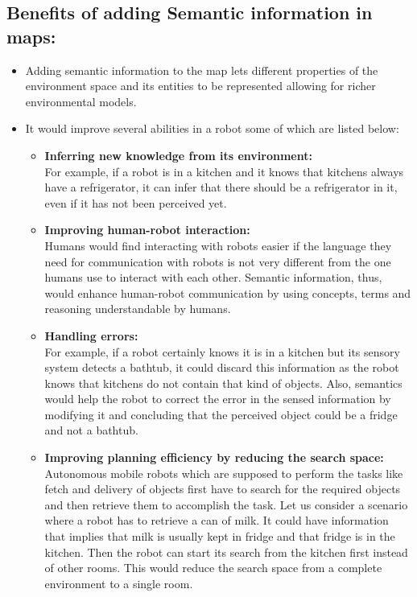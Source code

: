 \subsection{Benefits of adding Semantic information in maps:}
\begin{itemize}[noitemsep,nolistsep]
 \item Adding semantic information to the map lets different properties of the environment space and its entities to be represented allowing for richer environmental models.
 \item It would improve several abilities in a robot \cite{3,5,10} some of which are listed below:
 \begin{itemize}[noitemsep,nolistsep]
  \item \textbf{Inferring new knowledge from its environment:}\\
  For example, if a robot is in a kitchen and it knows that kitchens always have a refrigerator, it can infer that there should be a refrigerator in it, even if it has not been perceived yet. 
  \item \textbf{Improving human-robot interaction:}\\
  Humans would find interacting with robots easier if the language they need for communication with robots is not very different from the one humans use to interact with each other.
  Semantic information, thus, would enhance human-robot communication by using concepts, terms and reasoning understandable by humans.  
  \item \textbf{Handling errors:}\\
  For example, if a robot certainly knows it is in a kitchen but its sensory system detects a bathtub, it could discard this information as the robot knows that kitchens do not contain that kind of objects. Also, semantics would help the robot to correct the error in the sensed information by modifying it and concluding that the perceived object could be a fridge and not a bathtub. 
  \item \textbf{Improving  planning efficiency by reducing the search space:}\\
  Autonomous mobile robots which are supposed to perform the tasks like fetch and delivery of objects first have to search for the required objects and then retrieve them to accomplish the task. 
  Let us consider a scenario where a robot has to retrieve a can of milk. It could have information that implies that milk is usually kept in fridge and that fridge is in the kitchen. Then the robot can start its search from the kitchen first instead of other rooms.  This would reduce the search space from a complete environment to a single room.
  \end{itemize}
\end{itemize}
